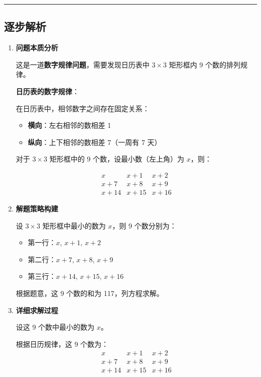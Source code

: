 \documentclass[UTF8]{ctexart}
\newenvironment{redenv}{\color{red}}{}
\newenvironment{detailedanalysis}{%
    \color{red}
    \begin{enumerate}[label=\textbf{第\arabic*步：}, leftmargin=*, align=left, itemsep=1.5ex]
}{%
    \end{enumerate}
}
\newenvironment{conceptbox}{%
    \begin{tcolorbox}[colback=red!5, colframe=red!50!black, title=概念解析, fonttitle=\bfseries]
}{%
    \end{tcolorbox}
}
\newcommand{\analysisrule}{\noindent\rule{\textwidth}{0.8pt}\vspace{-0.8em}}
\begin{document}
\begin{redenv}
\analysisrule
\subsection*{逐步解析}

\begin{detailedanalysis}
\item \textbf{问题本质分析}

这是一道\textbf{数字规律问题}，需要发现日历表中 $3 \times 3$ 矩形框内 9 个数的排列规律。

\begin{conceptbox}
\textbf{日历表的数字规律}：

在日历表中，相邻数字之间存在固定关系：
\begin{itemize}
    \item \textbf{横向}：左右相邻的数相差 1
    \item \textbf{纵向}：上下相邻的数相差 7（一周有 7 天）
\end{itemize}

对于 $3 \times 3$ 矩形框中的 9 个数，设最小数（左上角）为 $x$，则：

\[
\begin{array}{ccc}
x & x+1 & x+2 \\
x+7 & x+8 & x+9 \\
x+14 & x+15 & x+16
\end{array}
\]
\end{conceptbox}

\item \textbf{解题策略构建}

设 $3 \times 3$ 矩形框中最小的数为 $x$，则 9 个数分别为：
\begin{itemize}
    \item 第一行：$x$, $x+1$, $x+2$
    \item 第二行：$x+7$, $x+8$, $x+9$
    \item 第三行：$x+14$, $x+15$, $x+16$
\end{itemize}

根据题意，这 9 个数的和为 117，列方程求解。

\item \textbf{详细求解过程}

设这 9 个数中最小的数为 $x$。

根据日历规律，这 9 个数为：
\[
\begin{array}{ccc}
x & x+1 & x+2 \\
x+7 & x+8 & x+9 \\
x+14 & x+15 & x+16
\end{array}
\]


\end{detailedanalysis}
\end{redenv}
\end{document}
